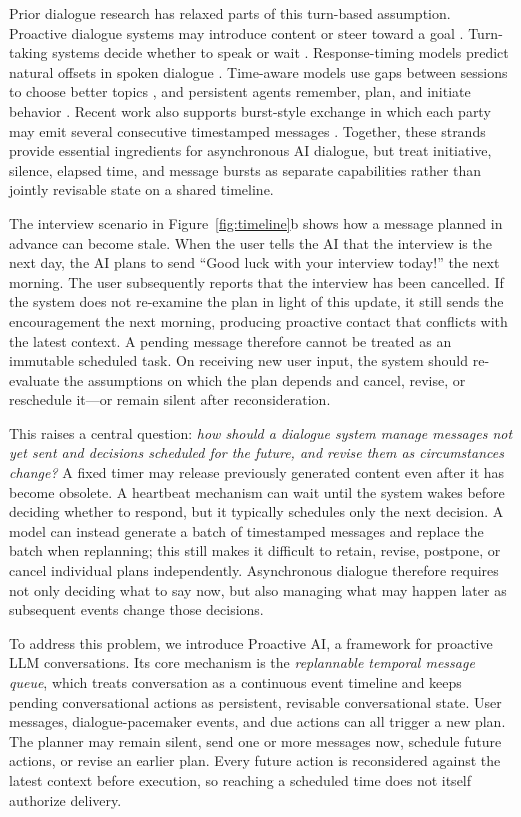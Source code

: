 \documentclass[manuscript,nonacm]{acmart}
\begin{document}
Prior dialogue research has relaxed parts of this turn-based assumption. Proactive
dialogue systems may introduce content or steer toward a goal
\cite{li2016stalemate,wu2019duconv,deng2023survey}. Turn-taking systems decide
whether to speak or wait \cite{lan2019when,lin2020wait}. Response-timing models
predict natural offsets in spoken dialogue \cite{roddy2020timings}. Time-aware
models use gaps between sessions to choose better topics \cite{zhang2023gap}, and
persistent agents remember, plan, and initiate behavior
\cite{park2023generative,liu2025inner}. Recent work also supports burst-style
exchange in which each party may emit several consecutive timestamped messages
\cite{wu2025xturing}.
Together, these strands provide essential ingredients for asynchronous AI
dialogue, but treat initiative, silence, elapsed time, and message bursts as
separate capabilities rather than jointly revisable state on a shared timeline.

The interview scenario in Figure~\ref{fig:timeline}b shows how a message planned
in advance can become stale. When the user tells the AI that the interview is the
next day, the AI plans to send ``Good luck with your interview today!'' the next
morning. The user subsequently reports that the interview has been cancelled. If
the system does not re-examine the plan in light of this update, it still sends
the encouragement the next morning, producing proactive contact that conflicts
with the latest context. A pending message therefore cannot be treated as an
immutable scheduled task. On receiving new user input, the system should
re-evaluate the assumptions on which the plan depends and cancel, revise, or
reschedule it---or remain silent after reconsideration.

This raises a central question: \emph{how should a dialogue system manage
messages not yet sent and decisions scheduled for the future, and revise them
as circumstances change?} A fixed timer may release previously generated content
even after it has become obsolete. A heartbeat mechanism can wait until the
system wakes before deciding whether to respond, but it typically schedules only
the next decision. A model can instead generate a batch of timestamped
messages and replace the batch when replanning; this still makes it difficult to
retain, revise, postpone, or cancel individual plans independently. Asynchronous
dialogue therefore requires not only deciding what to say now, but also managing
what may happen later as subsequent events change those decisions.

To address this problem, we introduce Proactive AI, a framework for proactive
LLM conversations. Its core mechanism is the \emph{replannable temporal message
queue}, which treats conversation as a continuous event timeline and keeps
pending conversational actions as persistent,
revisable conversational state. User messages, dialogue-pacemaker events, and due
actions can all trigger a new plan. The planner may remain silent, send one or more
messages now, schedule future actions, or revise an earlier plan. Every future
action is reconsidered against the latest context before execution, so reaching a
scheduled time does not itself authorize delivery.
\end{document}
